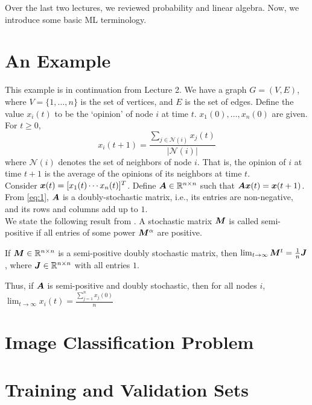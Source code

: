 \documentclass[12pt]{article}
\begin{document}
	\MakeScribeTop


Over the last two lectures, we reviewed probability and linear algebra. Now, we introduce some basic ML terminology.

\section{An Example}

This example is in continuation from Lecture 2. We have a graph $G = (V,E)$, where $V=\{1,\ldots,n\}$ is the set of vertices, and $E$ is the set of edges. Define the value $x_i(t)$ to be the `opinion' of node $i$ at time $t$. ${x_1(0),\dots,x_n(0)}$ are given. For $t\ge 0$,
\begin{equation} \label{eq:1}
	x_i(t+1) = \frac {\sum_{j\in \mathcal{N}(i)} x_j(t)}{|\mathcal{N}(i)|}
\end{equation}
where $\mathcal{N}(i)$ denotes the set of neighbors of node $i$. That is, the opinion of $i$ at time $t+1$ is the average of the opinions of its neighbors at time $t$.
\\
\noindent Consider ${\boldsymbol x}(t) = [x_1(t) \cdots x_n(t)]^T$. Define ${\boldsymbol A} \in \mathbb{R}^{n\times n}$ such that ${\boldsymbol A}{\boldsymbol x}(t) = {\boldsymbol x}(t+1)$. From \eqref{eq:1}, ${\boldsymbol A}$ is a doubly-stochastic matrix, i.e., its entries are non-negative, and its rows and columns add up to $1$.
\\

\noindent We state the following result from \cite{doublystochastic}. A stochastic matrix ${\boldsymbol M}$ is called semi-positive if all entries of some power ${\boldsymbol M}^\alpha$ are positive.
\begin{theorem}
	If ${\boldsymbol M} \in \mathbb{R}^{n\times n}$ is a semi-positive doubly stochastic matrix, then $\lim_{t\to \infty} {\boldsymbol M}^t = \frac{1}{n}{\boldsymbol J}$, where ${\boldsymbol J} \in \mathbb{R}^{n\times n}$ with all entries $1$.
\end{theorem}


\noindent Thus, if ${\boldsymbol A}$ is semi-positive and doubly stochastic, then for all nodes $i$, $\lim_{t\to \infty} x_i(t) = \frac{\sum_{j=1}^{n} x_j(0)}{n}$


\section{Image Classification Problem}

\section{Training and Validation Sets}


%


\end{document}

